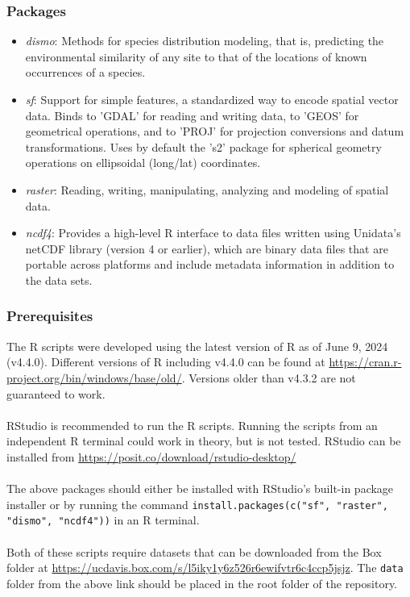 \documentclass{article}
\begin{document}
\subsubsection*{Packages}

\begin{itemize}
	\item \textit{dismo}: Methods for species distribution modeling, that is, predicting the environmental similarity of any site to that of the locations of known occurrences of a species.
	\item \textit{sf}: Support for simple features, a standardized way to encode spatial vector data. Binds to 'GDAL' for reading and writing data, to 'GEOS' for geometrical operations, and to 'PROJ' for projection conversions and datum transformations. Uses by default the 's2' package for spherical geometry operations on ellipsoidal (long/lat) coordinates.
	\item \textit{raster}: Reading, writing, manipulating, analyzing and modeling of spatial data. 
	\item \textit{ncdf4}: Provides a high-level R interface to data files written using Unidata's netCDF library (version 4 or earlier), which are binary data files that are portable across platforms and include metadata information in addition to the data sets.
\end{itemize}

\subsubsection*{Prerequisites}

The R scripts were developed using the latest version of R as of June 9, 2024 (v4.4.0). Different versions of R including v4.4.0 can be found at \url{https://cran.r-project.org/bin/windows/base/old/}. Versions older than v4.3.2 are not guaranteed to work.
\\\\
RStudio is recommended to run the R scripts. Running the scripts from an independent R terminal could work in theory, but is not tested. RStudio can be installed from \url{https://posit.co/download/rstudio-desktop/}
\\\\
The above packages should either be installed with RStudio's built-in package installer or by running the command \texttt{install.packages(c("sf", "raster", "dismo", "ncdf4"))} in an R terminal.
\\\\
Both of these scripts require datasets that can be downloaded from the Box folder at \url{https://ucdavis.box.com/s/l5iky1y6z526r6ewifvtr6c4ccp5jsjz}. The \texttt{data} folder from the above link should be placed in the root folder of the repository. 
\end{document}
